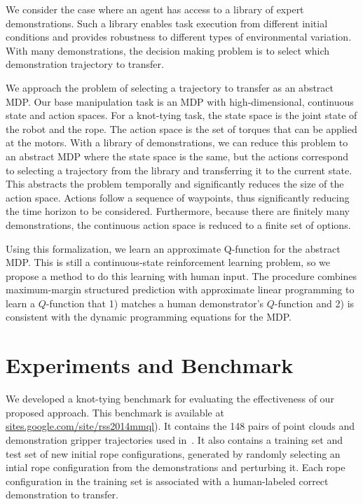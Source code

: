 \documentclass[conference]{IEEEtran}
\begin{document}
We consider the case where an agent has access to a library of expert
demonstrations. Such a library enables task execution from different
initial conditions and provides robustness to different types of
environmental variation. With many demonstrations, the decision making
problem is to select which demonstration trajectory to transfer.

We approach the problem of selecting a trajectory to transfer as an
abstract MDP. Our base manipulation task is an MDP with
high-dimensional, continuous state and action spaces. For a knot-tying
task, the state space is the joint state of the robot and the
rope. The action space is the set of torques that can be applied at
the motors. With a library of demonstrations, we can reduce this
problem to an abstract MDP where the state space is the same, but the
actions correspond to selecting a trajectory from the library and transferring it to
the current state. This abstracts the problem temporally and
significantly reduces the size of the action space. Actions follow a
sequence of waypoints, thus significantly reducing the time horizon to be considered.
Furthermore, because there are finitely many
demonstrations, the continuous action space is reduced to a finite
set of options.

Using this formalization, we learn an approximate Q-function for the
abstract MDP. This is still a continuous-state reinforcement learning
problem, so we propose a method to do this learning with human
input. The procedure combines maximum-margin structured prediction
with approximate linear programming to learn a $Q$-function that 1)
matches a human demonstrator's $Q$-function and 2) is consistent
with the dynamic programming equations for the MDP. 

\section{Experiments and Benchmark}

We developed a knot-tying benchmark for evaluating the effectiveness
of our proposed approach.  This benchmark is available at
\href{https://sites.google.com/site/rss2014mmql}{sites.google.com/site/rss2014mmql}). It
contains the 148 pairs of point clouds and demonstration gripper trajectories used
in~\citet{Schulmanetal_ISRR2013}. It also contains a training set and test set of new
initial rope configurations, generated by randomly selecting 
an intial rope configuration from the demonstrations and perturbing
it. Each rope configuration in the training set is
associated with a human-labeled correct demonstration to transfer.
\end{document}
